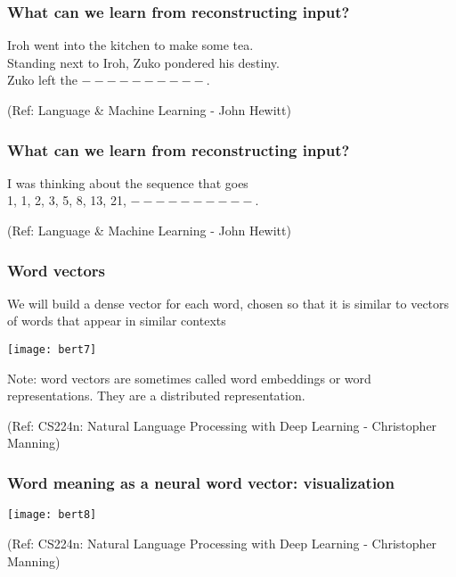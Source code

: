 \begin{frame}[fragile]\frametitle{What can we learn from reconstructing input?}

\begin{center}
Iroh went into the kitchen to make some tea.\\
Standing next to Iroh, Zuko pondered his destiny.\\
Zuko left the  $----------$.
\end{center}		  

{\tiny (Ref: Language \& Machine Learning - John Hewitt)}
\end{frame}

\begin{frame}[fragile]\frametitle{What can we learn from reconstructing input?}

\begin{center}
I was thinking about the sequence that goes  \\ 1, 1, 2, 3, 5, 8, 13, 21,   $----------$.
\end{center}		  

{\tiny (Ref: Language \& Machine Learning - John Hewitt)}
\end{frame}

\begin{frame}[fragile]\frametitle{Word vectors}

We will build a dense vector for each word, chosen so that it is  similar to vectors of words that appear in similar contexts
	  
\begin{center}
\texttt{[image: bert7]}
\end{center}		  
		
Note: word vectors are sometimes called word embeddings or  word representations. They are a distributed representation.

{\tiny (Ref: CS224n: Natural Language Processing with Deep Learning - Christopher Manning)}

\end{frame}

\begin{frame}[fragile]\frametitle{Word meaning as a neural word vector: visualization}

	  
\begin{center}
\texttt{[image: bert8]}
\end{center}		  
		

{\tiny (Ref: CS224n: Natural Language Processing with Deep Learning - Christopher Manning)}

\end{frame}

